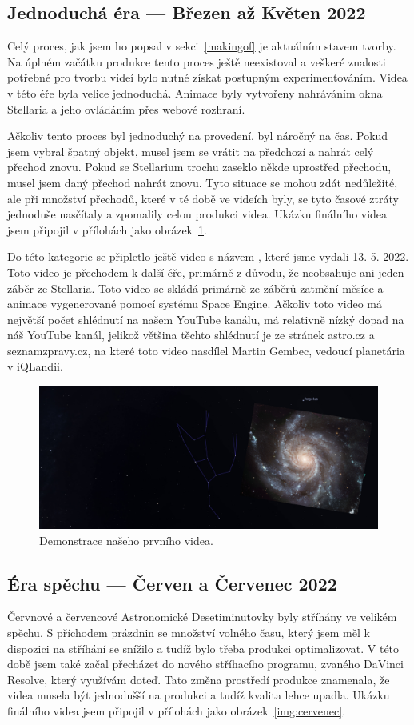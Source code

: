 \documentclass[12pt,a4paper,titlepage]{article}
\begin{document}
\subsection{Jednoduchá éra --- Březen až Květen 2022}
Celý proces, jak jsem ho popsal v sekci~\ref{makingof} je aktuálním stavem tvorby. Na úplném začátku produkce tento proces ještě neexistoval a veškeré znalosti potřebné pro tvorbu  videí bylo nutné získat postupným experimentováním. Videa v této éře byla velice jednoduchá. Animace byly vytvořeny nahráváním okna Stellaria a jeho ovládáním přes webové rozhraní. 

Ačkoliv tento proces byl jednoduchý na provedení, byl náročný na čas. Pokud jsem vybral špatný objekt, musel jsem se vrátit na předchozí a nahrát celý přechod znovu. Pokud se Stellarium trochu zaseklo někde uprostřed přechodu, musel jsem daný přechod nahrát znovu. Tyto situace se mohou zdát nedůležité, ale při množství přechodů, které v té době ve videích byly, se tyto časové ztráty jednoduše nasčítaly a zpomalily celou produkci videa. Ukázku finálního videa jsem připojil v přílohách jako obrázek~\ref{img:brezen}.

Do této kategorie se připletlo ještě video s názvem , které jsme vydali 13. 5. 2022. Toto video je přechodem k další éře, primárně z důvodu, že neobsahuje ani jeden záběr ze Stellaria. Toto video se skládá primárně ze záběrů zatmění měsíce a animace vygenerované pomocí systému Space Engine. Ačkoliv toto video má největší počet shlédnutí na našem YouTube kanálu, má relativně nízký dopad na náš YouTube kanál, jelikož většina těchto shlédnutí je ze stránek astro.cz a seznamzpravy.cz, na které toto video nasdílel Martin Gembec, vedoucí planetária v iQLandii.
\begin{figure}[ht]
	\centering
	\includegraphics[width=.85\textwidth]{brezen.png}
	\caption{Demonstrace našeho prvního videa.}\label{img:brezen}
\end{figure}
\subsection{Éra spěchu --- Červen a Červenec 2022}
Červnové a červencové Astronomické Desetiminutovky byly stříhány ve velikém spěchu. S příchodem prázdnin se množství volného času, který jsem měl k dispozici na stříhání se snížilo a tudíž bylo třeba produkci optimalizovat. V této době jsem také začal přecházet do nového stříhacího programu, zvaného DaVinci Resolve, který využívám doteď. Tato změna prostředí produkce znamenala, že videa musela být jednodušší na produkci a tudíž kvalita lehce upadla. Ukázku finálního videa jsem připojil v přílohách jako obrázek~\ref{img:cervenec}.
\end{document}
